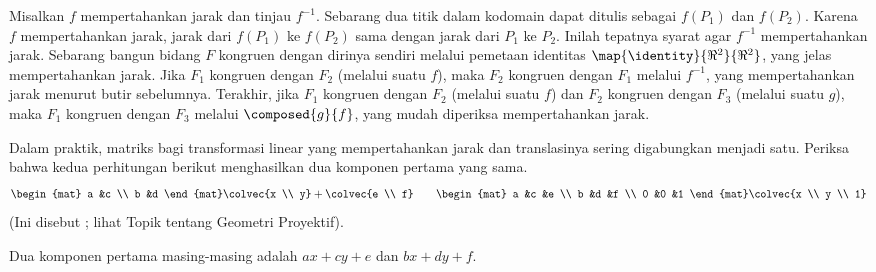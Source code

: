 \begin{exercises}
\begin{answer}
\begin{exparts}
         \partsitem Misalkan $f$ mempertahankan jarak dan tinjau $f^{-1}$.
           Sebarang dua titik dalam kodomain dapat ditulis sebagai $f(P_1)$
           dan $f(P_2)$. Karena $f$ mempertahankan jarak, jarak dari $f(P_1)$
           ke $f(P_2)$ sama dengan jarak dari $P_1$ ke $P_2$.
           Inilah tepatnya syarat agar $f^{-1}$ mempertahankan jarak.
         \partsitem Sebarang bangun bidang $F$ kongruen dengan dirinya sendiri
           melalui pemetaan identitas $\map{\identity}{\Re^2}{\Re^2}$, yang
           jelas mempertahankan jarak.
           Jika $F_1$ kongruen dengan $F_2$ (melalui suatu $f$), maka $F_2$
           kongruen dengan $F_1$ melalui $f^{-1}$, yang mempertahankan jarak
           menurut butir sebelumnya.
           Terakhir, jika $F_1$ kongruen dengan $F_2$ (melalui suatu $f$) dan
           $F_2$ kongruen dengan $F_3$ (melalui suatu $g$), maka $F_1$
           kongruen dengan $F_3$ melalui $\composed{g}{f}$, yang mudah
           diperiksa mempertahankan jarak.
       \end{exparts}
     \end{answer}
  \item \label{exer:HomoCrds}
    Dalam praktik, matriks bagi transformasi linear yang mempertahankan jarak
    dan translasinya sering digabungkan menjadi satu.
    Periksa bahwa kedua perhitungan berikut menghasilkan dua komponen pertama
    yang sama.
        \begin{equation*}
           \begin{mat}
             a  &c  \\
             b  &d
           \end{mat}
           \colvec{x  \\ y}
           +\colvec{e \\ f}
           \qquad
           \begin{mat}
             a  &c  &e \\
             b  &d  &f \\
             0  &0  &1
           \end{mat}
           \colvec{x  \\ y \\ 1}
        \end{equation*}
    (Ini disebut ; lihat
     Topik tentang Geometri Proyektif).
     \begin{answer}
       Dua komponen pertama masing-masing adalah $ax+cy+e$ dan $bx+dy+f$.
     \end{answer}

\end{exercises}
